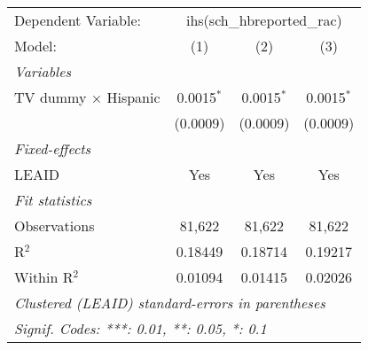 \begin{tabular}{lccc}
\tabularnewline\midrule\midrule
Dependent Variable:&\multicolumn{3}{c}{ihs(sch\_hbreported\_rac)}\\
Model:&(1) & (2) & (3)\\
\midrule \emph{Variables}&   &   &  \\
TV dummy $\times$ Hispanic & 0.0015$^{*}$ & 0.0015$^{*}$ & 0.0015$^{*}$\\
  &(0.0009) & (0.0009) & (0.0009)\\
\midrule \emph{Fixed-effects}&   &   &  \\
LEAID & Yes & Yes & Yes\\
\midrule \emph{Fit statistics}&  & & \\
Observations & 81,622&81,622&81,622\\
R$^2$ & 0.18449&0.18714&0.19217\\
Within R$^2$ & 0.01094&0.01415&0.02026\\
\midrule\midrule\multicolumn{4}{l}{\emph{Clustered (LEAID) standard-errors in parentheses}}\\
\multicolumn{4}{l}{\emph{Signif. Codes: ***: 0.01, **: 0.05, *: 0.1}}\\
\end{tabular}


